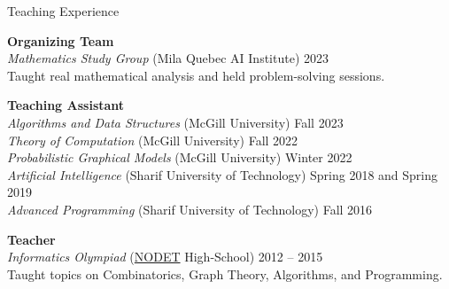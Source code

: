\documentclass{resume}
\newcommand{\InternalSpace}{\vspace{0.18cm}}
\newcommand{\ExternalSpace}{\vspace{-0.09cm}}
\newenvironment{MySection}[1]
{\begin{category}{#1}}
{\end{category}}
\newcommand{\MyItem}{\citembullet}
\begin{document}
\begin{MySection}{Teaching Experience}

\MyItem \textbf{Organizing Team}\\
\InternalSpace\ExternalSpace
\textit{Mathematics Study Group} (Mila Quebec AI Institute) \hfill 2023\\
Taught real mathematical analysis and held problem-solving sessions.
\InternalSpace\ExternalSpace

\MyItem \textbf{Teaching Assistant}\\
\InternalSpace\ExternalSpace
\textit{Algorithms and Data Structures} (McGill University) \hfill Fall 2023\\
\InternalSpace\ExternalSpace
\textit{Theory of Computation} (McGill University) \hfill Fall 2022\\
\InternalSpace\ExternalSpace
\textit{Probabilistic Graphical Models} (McGill University) \hfill Winter 2022\\
\InternalSpace\ExternalSpace
\textit{Artificial Intelligence} (Sharif University of Technology) \hfill Spring 2018 and Spring 2019\\
\InternalSpace\ExternalSpace
\textit{Advanced Programming} (Sharif University of Technology) \hfill Fall 2016\\
\InternalSpace\ExternalSpace

\MyItem \textbf{Teacher}\\ 
\InternalSpace\ExternalSpace
\textit{Informatics Olympiad} (\href{https://en.wikipedia.org/wiki/National_Organization_for_Development_of_Exceptional_Talents}{NODET} High-School) \hfill{2012 -- 2015}\\
Taught topics on Combinatorics, Graph Theory, Algorithms, and Programming.
\InternalSpace\ExternalSpace

\end{MySection}

\InternalSpace





\end{document}
